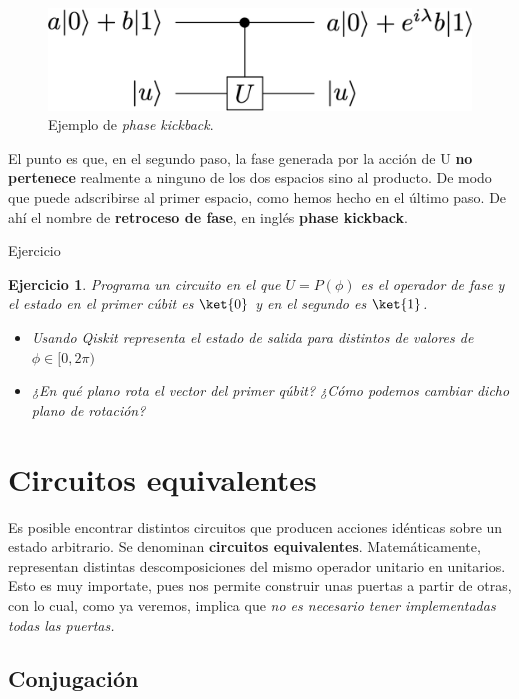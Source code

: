\documentclass[a4paper,11pt]{book} %
\newtheorem{ejercicio_contador}{Ejercicio}
\newcommand{\Ejercicio}[1]{
		\begin{mybox_gray}{Ejercicio} 
			\begin{ejercicio_contador}
				 #1 
			\end{ejercicio_contador} 
		\end{mybox_gray}
	}
\numberwithin{equation}{chapter}
\begin{document}
		\begin{figure}[H]
		\centering 
		\includegraphics[width=0.45\linewidth]{Figuras/Fig_elementos_phase_kickback.png}
		\caption{Ejemplo de \textit{phase kickback}.}
		\label{Fig_elementos_phase_kickback.}
		\end{figure}

El punto es que, en el segundo paso, la fase generada por la acción de U \textbf{no pertenece} realmente a ninguno de los dos espacios sino al producto. De modo que puede adscribirse al primer espacio, como hemos hecho en el último paso. De ahí el nombre de \textbf{retroceso de fase}, en inglés \textbf{phase kickback}.

	\Ejercicio{
	Programa un circuito en el que  $U = P(\phi)$ es el operador de fase y el estado en el primer cúbit es $\ket{0}$ y en el segundo es $\ket{1}$. 
	\begin{itemize}
		\item[a)] Usando Qiskit representa el estado de salida para distintos de valores de $\phi \in [0, 2 \pi )$
		
		\item[b)] ¿En qué plano rota el vector del primer qúbit? ¿Cómo podemos cambiar dicho plano de rotación?
	\end{itemize}
	}	   
    


	\section{Circuitos equivalentes}

Es posible encontrar distintos circuitos que producen acciones idénticas sobre un estado arbitrario. Se denominan \textbf{circuitos equivalentes}. Matemáticamente, representan distintas descomposiciones del mismo operador unitario en unitarios. Esto es muy importate, pues nos permite construir unas puertas a partir de otras, con lo cual, como ya veremos, implica que  \textit{no es necesario tener implementadas todas las puertas.}


        \subsection{Conjugación}
\end{document}
